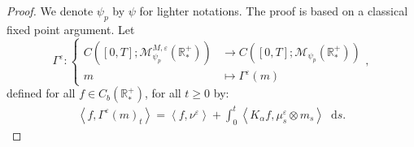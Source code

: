 \documentclass[11pt,a4paper]{article}
\newcommand{\RR}{\mathbb{R}}
\newcommand{\RRP}{\mathbb{R}^+_*}
\newcommand{\MC}{\mathcal{M}}
\newcommand{\brac}[1]{\left\langle#1\right\rangle}
\newcommand{\dd}{\mathop{}\!\mathrm{d}}
\begin{document}
\begin{proof}
    We denote $\psi_p$ by $\psi$ for lighter notations. The proof is based on a classical fixed point argument. Let 
    \[ \Gamma^\varepsilon : 
    \left\lbrace 
    \begin{aligned}
        C\left([0,T];\MC^{M,\varepsilon}_{\psi_p}\left(\RRP\right) \right) &\to C\left([0,T];\MC_{\psi_p}\left(\RRP\right) \right)\\
         m & \mapsto \Gamma^\varepsilon(m)
    \end{aligned}
    \right.,
    \]
    defined for all $f \in C_b\left( \RR_*^+\right)$, for all $t \geq 0$ by:
    \begin{align*}
        \brac{f,\Gamma^\varepsilon(m)_t} = \brac{f,\nu^\varepsilon} + \int_0^t \brac{K_\alpha f,\mu^\varepsilon_s\otimes m_s} \dd s.
    \end{align*}


\end{proof}
\end{document}
